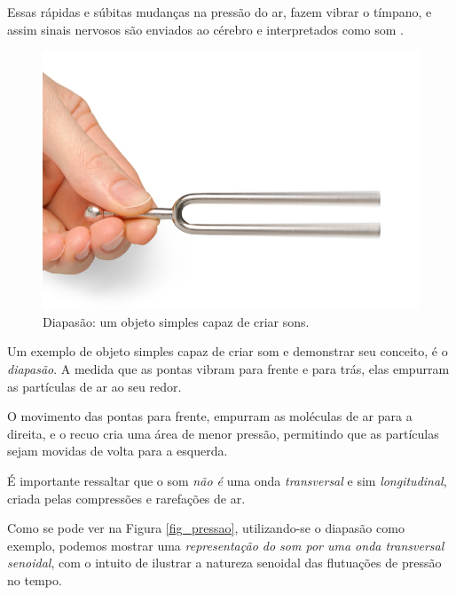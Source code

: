 \documentclass[
    12pt,               %
    openright,          %
    oneside,
    a4paper,            
    english,            %
    brazil              %
    ]{abntex2}
\begin{document}
Essas rápidas e súbitas mudanças na pressão do ar, fazem vibrar o tímpano, e assim sinais nervosos são enviados ao cérebro e interpretados como som \cite{soundtrack}.

\begin{figure}[!htb]
  \caption{\label{fig_diapasao}Diapasão: um objeto simples capaz de criar sons.}
  \begin{center}
  \includegraphics[scale=0.17]{images/tuning-fork.jpg}
  \end{center}
\end{figure}

Um exemplo de objeto simples capaz de criar som e demonstrar seu conceito, é o \textit{diapasão}. A medida que as pontas vibram para frente e para trás, elas empurram as partículas de ar ao seu redor.

O movimento das pontas para frente, empurram as moléculas de ar para a direita, e o recuo cria uma área de menor pressão, permitindo que as partículas sejam movidas de volta para a esquerda.

É importante ressaltar que o som \textit{não é} uma onda \textit{transversal} e sim \textit{longitudinal}, criada pelas compressões e rarefações de ar.

Como se pode ver na Figura \ref{fig_pressao}, utilizando-se o diapasão como exemplo, podemos mostrar uma \textit{representação do som por uma onda transversal senoidal}, com o intuito de ilustrar a natureza senoidal das flutuações de pressão no tempo. 
\end{document}
